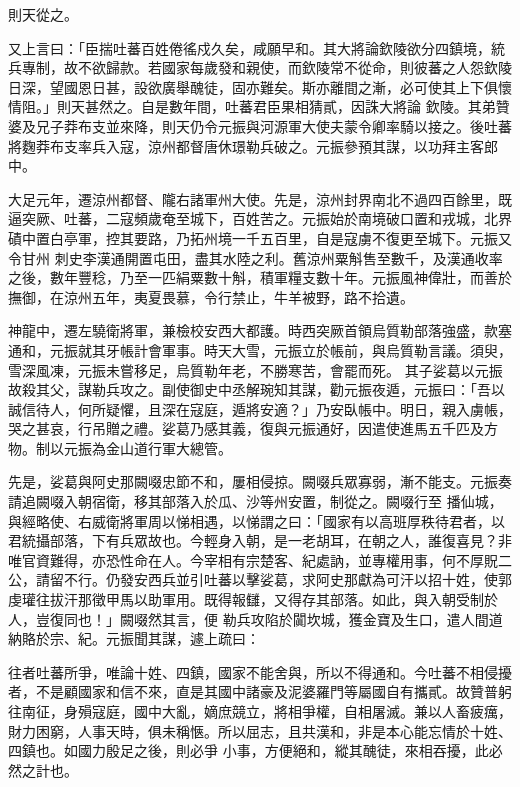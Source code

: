 \begin{pinyinscope}
 則天從之。



 又上言曰：「臣揣吐蕃百姓倦徭戍久矣，咸願早和。其大將論欽陵欲分四鎮境，統兵專制，故不欲歸款。若國家每歲發和親使，而欽陵常不從命，則彼蕃之人怨欽陵日深，望國恩日甚，設欲廣舉醜徒，固亦難矣。斯亦離間之漸，必可使其上下俱懷情阻。」則天甚然之。自是數年間，吐蕃君臣果相猜貳，因誅大將論
 欽陵。其弟贊婆及兄子莽布支並來降，則天仍令元振與河源軍大使夫蒙令卿率騎以接之。後吐蕃將麴莽布支率兵入寇，涼州都督唐休璟勒兵破之。元振參預其謀，以功拜主客郎中。



 大足元年，遷涼州都督、隴右諸軍州大使。先是，涼州封界南北不過四百餘里，既逼突厥、吐蕃，二寇頻歲奄至城下，百姓苦之。元振始於南境破口置和戎城，北界磧中置白亭軍，控其要路，乃拓州境一千五百里，自是寇虜不復更至城下。元振又令甘州
 刺史李漢通開置屯田，盡其水陸之利。舊涼州粟斛售至數千，及漢通收率之後，數年豐稔，乃至一匹絹粟數十斛，積軍糧支數十年。元振風神偉壯，而善於撫御，在涼州五年，夷夏畏慕，令行禁止，牛羊被野，路不拾遺。



 神龍中，遷左驍衛將軍，兼檢校安西大都護。時西突厥首領烏質勒部落強盛，款塞通和，元振就其牙帳計會軍事。時天大雪，元振立於帳前，與烏質勒言議。須臾，雪深風凍，元振未嘗移足，烏質勒年老，不勝寒苦，會罷而死。
 其子娑葛以元振故殺其父，謀勒兵攻之。副使御史中丞解琬知其謀，勸元振夜遁，元振曰：「吾以誠信待人，何所疑懼，且深在寇庭，遁將安適？」乃安臥帳中。明日，親入虜帳，哭之甚哀，行吊贈之禮。娑葛乃感其義，復與元振通好，因遣使進馬五千匹及方物。制以元振為金山道行軍大總管。



 先是，娑葛與阿史那闕啜忠節不和，屢相侵掠。闕啜兵眾寡弱，漸不能支。元振奏請追闕啜入朝宿衛，移其部落入於瓜、沙等州安置，制從之。闕啜行至
 播仙城，與經略使、右威衛將軍周以悌相遇，以悌謂之曰：「國家有以高班厚秩待君者，以君統攝部落，下有兵眾故也。今輕身入朝，是一老胡耳，在朝之人，誰復喜見？非唯官資難得，亦恐性命在人。今宰相有宗楚客、紀處訥，並專權用事，何不厚貺二公，請留不行。仍發安西兵並引吐蕃以擊娑葛，求阿史那獻為可汗以招十姓，使郭虔瓘往拔汗那徵甲馬以助軍用。既得報讎，又得存其部落。如此，與入朝受制於人，豈復同也！」闕啜然其言，便
 勒兵攻陷於闐坎城，獲金寶及生口，遣人間道納賂於宗、紀。元振聞其謀，遽上疏曰：



 往者吐蕃所爭，唯論十姓、四鎮，國家不能舍與，所以不得通和。今吐蕃不相侵擾者，不是顧國家和信不來，直是其國中諸豪及泥婆羅門等屬國自有攜貳。故贊普躬往南征，身殞寇庭，國中大亂，嫡庶競立，將相爭權，自相屠滅。兼以人畜疲癘，財力困窮，人事天時，俱未稱愜。所以屈志，且共漢和，非是本心能忘情於十姓、四鎮也。如國力殷足之後，則必爭
 小事，方便絕和，縱其醜徒，來相吞擾，此必然之計也。




\end{pinyinscope}
